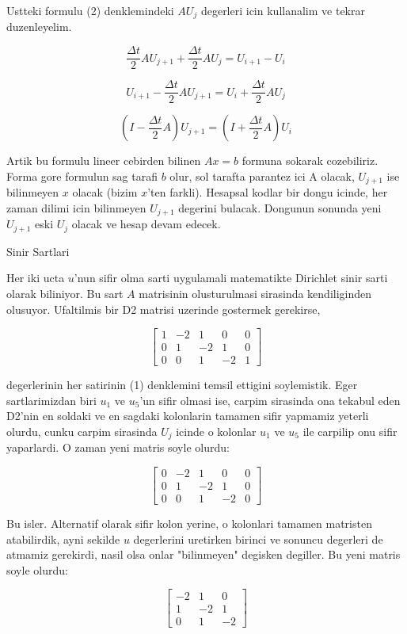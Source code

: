 \documentclass[12pt,fleqn]{article}\usepackage{../common}
\begin{document}
Ustteki formulu (2) denklemindeki $AU_j$ degerleri
icin kullanalim ve tekrar duzenleyelim.

$$ \frac{\Delta t}{2}AU_{j+1} + \frac{\Delta t}{2}AU_j = U_{i+1} - U_i  $$

$$ U_{i+1} - \frac{\Delta t}{2}AU_{j+1} = U_i + \frac{\Delta t}{2}AU_j  $$

$$ (I - \frac{\Delta t}{2}A) U_{j+1} = (I + \frac{\Delta t}{2}A)U_i $$

Artik bu formulu lineer cebirden bilinen $Ax=b$ formuna sokarak
cozebiliriz. Forma gore formulun sag tarafi $b$ olur, sol tarafta parantez ici A
olacak, $U_{j+1}$ ise bilinmeyen $x$ olacak (bizim $x$'ten farkli). Hesapsal
kodlar bir dongu icinde, her zaman dilimi icin bilinmeyen $U_{j+1}$ degerini
bulacak. Dongunun sonunda yeni $U_{j+1}$ eski $U_j$ olacak ve hesap devam
edecek. 

Sinir Sartlari

Her iki ucta $u$'nun sifir olma sarti uygulamali matematikte Dirichlet sinir
sarti olarak biliniyor. Bu sart $A$ matrisinin olusturulmasi sirasinda
kendiliginden olusuyor. Ufaltilmis bir D2 matrisi uzerinde gostermek gerekirse, 

$$ \left[ \begin{array}{ccccc}
1 & -2 & 1 & 0 & 0 \\
0 & 1 & -2 & 1 & 0 \\
0 & 0 & 1 & -2 & 1
\end{array} \right]
 $$

degerlerinin her satirinin (1) denklemini temsil ettigini
soylemistik. Eger sartlarimizdan biri $u_1$ ve $u_5$'un sifir olmasi ise, carpim
sirasinda ona tekabul eden D2'nin en soldaki ve en sagdaki kolonlarin tamamen
sifir yapmamiz yeterli olurdu, cunku carpim sirasinda $U_j$ icinde o kolonlar
$u_1$ ve $u_5$ ile carpilip onu sifir yaparlardi. O zaman yeni matris soyle
olurdu:

$$ 
\left[ \begin{array}{ccccc}
0 & -2 & 1 & 0 & 0 \\
0 & 1 & -2 & 1 & 0 \\
0 & 0 & 1 & -2 & 0
\end{array} \right]
 $$

Bu isler. Alternatif olarak sifir kolon yerine, o kolonlari tamamen matristen
atabilirdik, ayni sekilde $u$ degerlerini uretirken birinci ve sonuncu degerleri
de atmamiz gerekirdi, nasil olsa onlar "bilinmeyen" degisken degiller. Bu yeni
matris soyle olurdu:

$$ \left[ \begin{array}{ccc}
-2 & 1 & 0  \\
1 & -2 & 1  \\
0 & 1 & -2 
\end{array} \right]
$$
\end{document}
